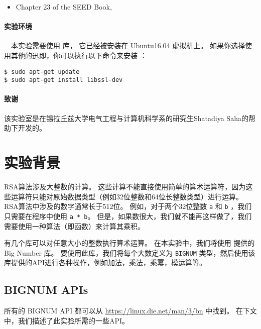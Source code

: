 \begin{itemize}
\item Chapter 23 of the SEED Book, \seedbook
\end{itemize}

\paragraph{实验环境} \seedenvironment \ \
本实验需要使用 \openssl 库，
它已经被安装在 Ubuntu16.04 虚拟机上。
如果你选择使用其他的迅即，你可以执行以下命令来安装 \openssl ：

\begin{lstlisting}
$ sudo apt-get update
$ sudo apt-get install libssl-dev
\end{lstlisting}

\paragraph{致谢}
该实验室是在锡拉丘兹大学电气工程与计算机科学系的研究生Shatadiya Saha的帮助下开发的。


\section{实验背景}

RSA算法涉及大整数的计算。
这些计算不能直接使用简单的算术运算符，因为这些运算符只能对原始数据类型（例如32位整数和64位长整数类型）进行运算。
RSA算法中涉及的数字通常长于512位。
例如，对于两个32位整数 \texttt{a} 和 \texttt{b} ，我们只需要在程序中使用 \texttt{a * b}。
但是，如果数很大，我们就不能再这样做了，我们需要使用一种算法（即函数）来计算其乘积。

有几个库可以对任意大小的整数执行算术运算。
在本实验中，我们将使用 \openssl 提供的 Big Number 库。
要使用此库，我们将每个大数定义为 \texttt{BIGNUM} 类型，然后使用该库提供的API进行各种操作，例如加法，乘法，乘幂，模运算等。


\subsection{BIGNUM APIs}

所有的 BIGNUM API 都可以从 \url{https://linux.die.net/man/3/bn} 中找到。
在下文中，我们描述了此实验所需的一些API。


